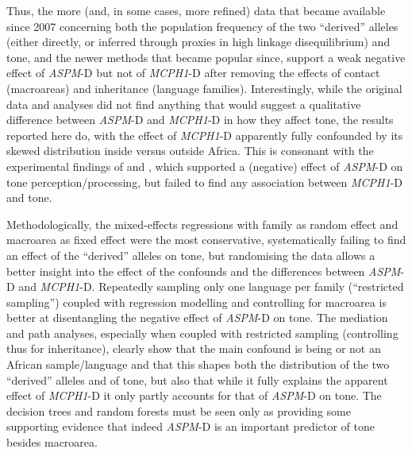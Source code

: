\documentclass[twoside,onecolumn]{article}
\begin{document}
Thus, the more (and, in some cases, more refined) data that became available since 2007 concerning both the population frequency of the two ``derived'' alleles (either directly, or inferred through proxies in high linkage disequilibrium) and tone, and the newer methods that became popular since, support a weak negative effect of \textit{ASPM}-D but not of \textit{MCPH1}-D after removing the effects of contact (macroareas) and inheritance (language families).
Interestingly, while the original data and analyses \citep{dediu_ladd_2007} did not find anything that would suggest a qualitative difference between \textit{ASPM}-D and \textit{MCPH1}-D in how they affect tone, the results reported here do, with the effect of \textit{MCPH1}-D apparently fully confounded by its skewed distribution inside versus outside Africa.
This is consonant with the experimental findings of \citet{wong_plosone_2012} and \citet{wong_sciadv_2020}, which supported a (negative) effect of \textit{ASPM}-D on tone perception/processing, but failed to find any association between \textit{MCPH1}-D and tone.

Methodologically, the mixed-effects regressions with family as random effect and macroarea as fixed effect were the most conservative, systematically failing to find an effect of the ``derived'' alleles on tone, but randomising the data allows a better insight into the effect of the confounds and the differences between \textit{ASPM}-D and \textit{MCPH1}-D.
Repeatedly sampling only one language per family (``restricted sampling'') coupled with regression modelling and controlling for macroarea is better at disentangling the negative effect of \textit{ASPM}-D on tone.
The mediation and path analyses, especially when coupled with restricted sampling (controlling thus for inheritance), clearly show that the main confound is being or not an African sample/language and that this shapes both the distribution of the two ``derived'' alleles and of tone, but also that while it fully explains the apparent effect of \textit{MCPH1}-D it only partly accounts for that of \textit{ASPM}-D on tone.
The decision trees and random forests must be seen only as providing some supporting evidence that indeed \textit{ASPM}-D is an important predictor of tone besides macroarea.
\end{document}
